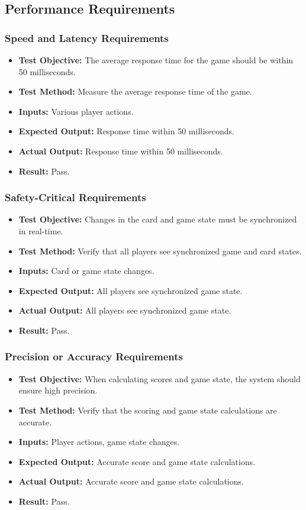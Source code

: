 \documentclass[12pt, titlepage]{article}
\begin{document}
\subsection{Performance Requirements}

\subsubsection{Speed and Latency Requirements}
\begin{itemize}
    \item \textbf{Test Objective:} The average response time for the game should be within 50 milliseconds.
    \item \textbf{Test Method:} Measure the average response time of the game.
    \item \textbf{Inputs:} Various player actions.
    \item \textbf{Expected Output:} Response time within 50 milliseconds.
    \item \textbf{Actual Output:} Response time within 50 milliseconds.
    \item \textbf{Result:} Pass.
\end{itemize}

\subsubsection{Safety-Critical Requirements}
\begin{itemize}
    \item \textbf{Test Objective:} Changes in the card and game state must be synchronized in real-time.
    \item \textbf{Test Method:} Verify that all players see synchronized game and card states.
    \item \textbf{Inputs:} Card or game state changes.
    \item \textbf{Expected Output:} All players see synchronized game state.
    \item \textbf{Actual Output:} All players see synchronized game state.
    \item \textbf{Result:} Pass.
\end{itemize}

\subsubsection{Precision or Accuracy Requirements}
\begin{itemize}
    \item \textbf{Test Objective:} When calculating scores and game state, the system should ensure high precision.
    \item \textbf{Test Method:} Verify that the scoring and game state calculations are accurate.
    \item \textbf{Inputs:} Player actions, game state changes.
    \item \textbf{Expected Output:} Accurate score and game state calculations.
    \item \textbf{Actual Output:} Accurate score and game state calculations.
    \item \textbf{Result:} Pass.
\end{itemize}
\end{document}

